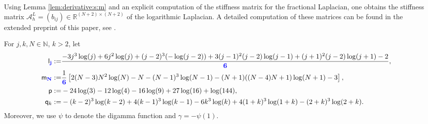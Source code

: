 \documentclass[11 pt]{article}
\newcommand\blue[1]{{\color{blue}\textbf{#1}}}
\newcommand\inter[1]{\llbracket #1\rrbracket}
\numberwithin{equation}{section}
\def\R{\mathbb{R}}
\begin{document}



Using Lemma \ref{lem:derivative:s:m} and an explicit computation of the stiffness matrix for the fractional Laplacian, one obtains the stiffness matrix $\mathcal A_{h}^{L}=(b_{ij})\in{\R^{(N+2)\times(N+2)}}$ of the logarithmic Laplacian. A detailed computation of these matrices can be found in the extended preprint of this paper, see \cite[Section 5]{HSJSS23}.

For $j,k,N\in \mathbb N$, $k>2$, let
\begin{align*} \notag
\mathsf{l}_{\blue{j}}:= & \frac{-3 j^3 \log (j)+6 j^2 \log (j)+(j-2)^3 (-\log (j-2))+3
   (j-1)^2 (j-2) \log (j-1)+(j+1)^2 (j-2) \log (j+1)-2}{\blue{6}}, \\
   \mathsf{m}_{\blue N}:= & \frac{1}{\blue{6}}\left[2 (N-3) N^2 \log (N)-N-(N-1)^3 \log (N-1)-(N+1) ((N-4) N+1) \log (N+1)-3\right], \\
\mathsf{p}:=&  -24\log(3) - 12\log(4) - 16\log(9) + 27\log(16) + \log(144), \\ \notag
\mathsf{q}_k:=&-(k-2)^3\log(k-2) + 4(k-1)^3\log(k-1) - 6 k^3 \log(k) +4(1 + k)^3\log(1 + k) - (2 + k)^3\log(2 + k).
\end{align*}
 Moreover, we use $\psi$ to denote the digamma function and $\gamma=-\psi(1)$.
\end{document}
